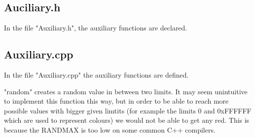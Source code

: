 \documentclass[11pt,titlepage]{article}
\begin{document}
			\subsection{Auciliary.h}
			In the file "Auxiliary.h", the auxiliary functions are declared.
				\lstset{firstnumber=1}
				
			\subsection{Auxiliary.cpp}
			In the file "Auxiliary.cpp" the auxiliary functions are defined.
			
			"random" creates a random value in between two limits. It may seem unintuitive to implement this function this way, but in order to be able to reach more possible values with bigger given limtits (for example the limits 0 and 0xFFFFFF which are used to represent colours) we would not be able to get any red. This is because the RAND\textunderscore MAX is too low on some common C++ compilers.
				
\end{document}
